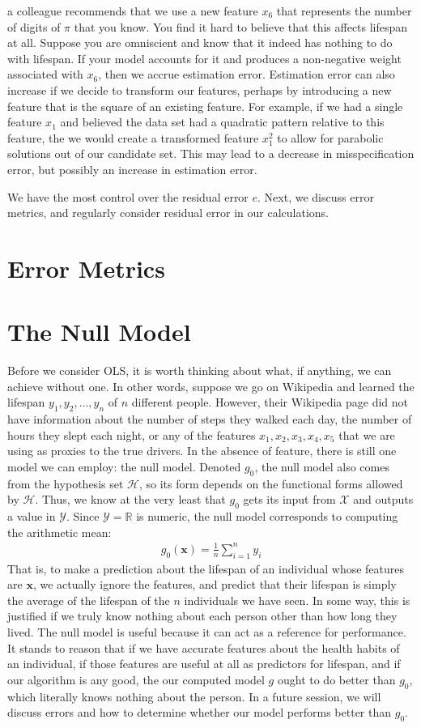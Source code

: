 \documentclass[12pt]{article}
\begin{document}
	a colleague recommends that we use a new feature $x_6$ that represents
	the number of digits of $\pi$ that you know. You find it hard to believe that
	this affects lifespan at all. Suppose you are omniscient and know that it
	indeed has nothing to do with lifespan. If your model accounts for it
	and produces a non-negative weight associated with $x_6$, then we accrue
	estimation error. Estimation error can also increase if we decide to transform
	our features, perhaps by introducing a new feature that is the square
	of an existing feature. For example, if we had a single feature $x_1$
	and believed the data set had a quadratic pattern relative to this feature,
	the we would create a transformed feature $x_1^2$ to allow for parabolic
	solutions out of our candidate set. This may lead to a decrease in misspecification
	error, but possibly an increase in estimation error.
	
	We have the most control over the residual error $e$. Next, we discuss error
	metrics, and regularly consider residual error in our calculations.
	\section{Error Metrics}
	\section{The Null Model}
	Before we consider OLS, it is worth thinking about what,
	if anything, we can achieve without one. In other words, suppose
	we go on Wikipedia and learned the lifespan $y_1,y_2,\ldots,y_n$
	of $n$ different people. However, their Wikipedia page did not
	have information about the number of steps they walked each day,
	the number of hours they slept each night, or any of the features
	$x_1,x_2,x_3,x_4,x_5$ that we are using as proxies to the true drivers.
	In the absence of feature, there is still one model we can employ:
	the null model. Denoted $g_0$, the null model also comes from
	the hypothesis set $\mathcal{H}$, so its form depends on the
	functional forms allowed by $\mathcal{H}$. Thus, we know at the
	very least that $g_0$ gets its input from $\mathcal{X}$ and
	outputs a value in $\mathcal{Y}$. Since $\mathcal{Y}=\mathbb{R}$
	is numeric, the null model corresponds to computing the arithmetic
	mean:
	\begin{align*}
		g_0(\bm{x})= \frac{1}{n}\sum_{i=1}^{n}y_i
	\end{align*}
	That is, to make a prediction about the lifespan of an individual
	whose features are $\bm{x}$, we actually ignore the features,
	and predict that their lifespan is simply the average of the lifespan
	of the $n$ individuals we have seen. In some way, this is justified
	if we truly know nothing about each person other than how long they
	lived. The null model is useful because it can act as a reference for
	performance. It stands to reason that if we have accurate features
	about the health habits of an individual, if those features are
	useful at all as predictors for lifespan, and if our algorithm
	is any good, the our computed model $g$ ought to do better than $g_0$,
	which literally knows nothing about the person. In a future session,
	we will discuss errors and how to determine whether our model performs
	better than $g_0$.
\end{document}
